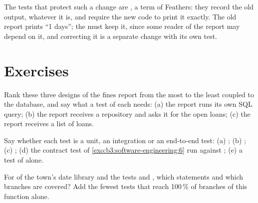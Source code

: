 \label{lst:b3:software-engineering:after}

The tests that protect such a change are , a term of Feathers: they record the old output, whatever it is, and require the new code to print it exactly. %
The old report prints ``1 days''; the  must keep it, since some reader of the report may depend on it, and correcting it is a separate change with its own test.

\label{out:b3:software-engineering:refactor}

\section{Exercises}\label{sec:b3:software-engineering:exercises}

\begin{exercise}[$\star$]\label{exo:b3:software-engineering:1}
Rank these three designs of the fines report from the most to the least coupled to the database, and say what a test of each needs: (a) the report runs its own SQL query; (b) the report receives a repository and asks it for the open loans; (c) the report receives a list of loans.
\end{exercise}

\begin{exercise}[$\star$]\label{exo:b3:software-engineering:2}
Say whether each test is a unit, an integration or an end-to-end test: (a) ; (b) ; (c) ; (d) the contract test of \cref{exo:b3:software-engineering:6} run against ; (e) a test of  alone.
\end{exercise}

\begin{exercise}[$\star$]\label{exo:b3:software-engineering:3}
For  of the town's date library and the tests  and , which statements and which branches are covered? Add the fewest tests that reach 100\,\% of branches of this function alone.
\end{exercise}

